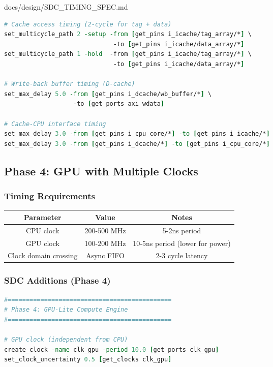 \begin{relocated}{docs/design/SDC_TIMING_SPEC.md}
\begin{lstlisting}[language=tcl]
# Cache access timing (2-cycle for tag + data)
set_multicycle_path 2 -setup -from [get_pins i_icache/tag_array/*] \
                              -to [get_pins i_icache/data_array/*]
set_multicycle_path 1 -hold  -from [get_pins i_icache/tag_array/*] \
                              -to [get_pins i_icache/data_array/*]

# Write-back buffer timing (D-cache)
set_max_delay 5.0 -from [get_pins i_dcache/wb_buffer/*] \
                   -to [get_ports axi_wdata]

# Cache-CPU interface timing
set_max_delay 3.0 -from [get_pins i_cpu_core/*] -to [get_pins i_icache/*]
set_max_delay 3.0 -from [get_pins i_dcache/*] -to [get_pins i_cpu_core/*]
\end{lstlisting}

\subsection{Phase 4: GPU with Multiple Clocks}\label{ds:ch:sdc-timing-spec:phase-4-gpu-with-multiple-clocks}

\subsubsection{Timing Requirements}\label{ds:ch:sdc-timing-spec:timing-requirements-3}

{
\begin{longtable}[]{@{}ccc@{}}
\toprule\noalign{}
Parameter & Value & Notes \\
\midrule\noalign{}
\endhead
\bottomrule\noalign{}
\endlastfoot
CPU clock & 200-500 MHz & 5-2ns period \\
GPU clock & 100-200 MHz & 10-5ns period (lower for power) \\
Clock domain crossing & Async FIFO & 2-3 cycle latency \\
\end{longtable}
}

\subsubsection{SDC Additions (Phase 4)}\label{ds:ch:sdc-timing-spec:sdc-additions-phase-4}

\begin{lstlisting}[language=tcl]
#=============================================
# Phase 4: GPU-Lite Compute Engine
#=============================================

# GPU clock (independent from CPU)
create_clock -name clk_gpu -period 10.0 [get_ports clk_gpu]
set_clock_uncertainty 0.5 [get_clocks clk_gpu]


\end{lstlisting}
\end{relocated}
